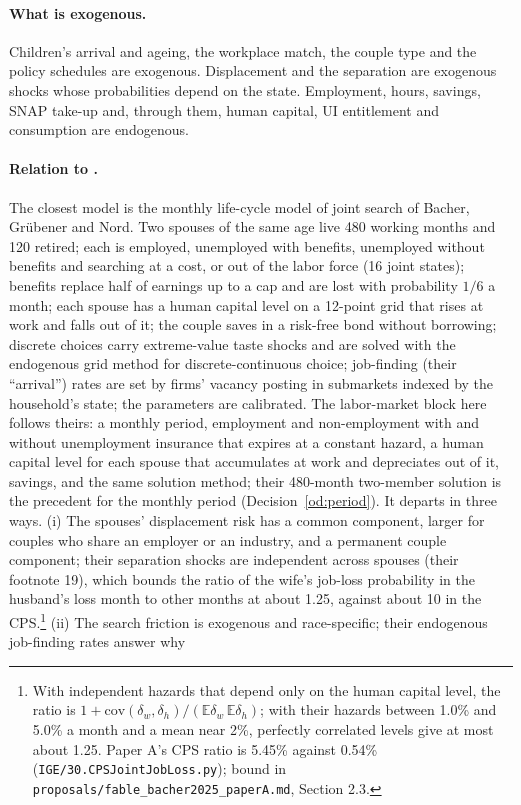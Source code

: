 \documentclass[11pt]{article}
\newcommand{\code}[1]{\texttt{#1}}
\newcommand{\E}{\mathbb{E}}
\newcommand{\1}{\mathbf{1}}
\begin{document}
\paragraph{What is exogenous.} Children's arrival and ageing, the workplace match, the couple type and the policy
schedules are exogenous. Displacement and the separation are exogenous shocks whose probabilities depend on the state.
Employment, hours, savings, SNAP take-up and, through them, human capital, UI entitlement and consumption are
endogenous.

\paragraph{Relation to \citet{bacher2025joint}.} The closest model is the monthly life-cycle model of joint search of
Bacher, Gr\"ubener and Nord. Two spouses of the same age live 480 working months and 120 retired; each is employed,
unemployed with benefits, unemployed without benefits and searching at a cost, or out of the labor force (16 joint
states); benefits replace half of earnings up to a cap and are lost with probability $1/6$ a month; each spouse has a
human capital level on a 12-point grid that rises at work and falls out of it; the couple saves in a risk-free bond
without borrowing; discrete choices carry extreme-value taste shocks and are solved with the endogenous grid method for
discrete-continuous choice; job-finding (their ``arrival'') rates are set by firms' vacancy posting in submarkets
indexed by the household's state; the parameters are calibrated. The labor-market block here follows theirs: a monthly
period, employment and non-employment with and without unemployment insurance that expires at a constant hazard, a
human capital level for each spouse that accumulates at work and depreciates out of it, savings, and the same solution
method; their 480-month two-member solution is the precedent for the monthly period (Decision~\ref{od:period}). It
departs in three ways. (i) The spouses' displacement risk has a common component, larger for couples who share an
employer or an industry, and a permanent couple component; their separation shocks are independent across spouses
(their footnote 19), which bounds the ratio of the wife's job-loss probability in the husband's loss month to other
months at about 1.25, against about 10 in the CPS.\footnote{With independent hazards that depend only on the human
capital level, the ratio is $1 + \mathrm{cov}(\delta_w, \delta_h)/(\E\delta_w\,\E\delta_h)$; with their hazards between
1.0\% and 5.0\% a month and a mean near 2\%, perfectly correlated levels give at most about 1.25. Paper A's CPS ratio is
5.45\% against 0.54\% (\code{IGE/30.CPSJointJobLoss.py}); bound in \code{proposals/fable\_bacher2025\_paperA.md},
Section 2.3.} (ii) The search friction is exogenous and race-specific; their endogenous job-finding rates answer why
\end{document}
